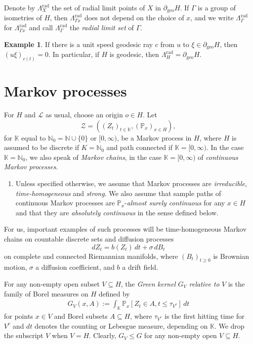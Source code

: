 \documentclass[12pt,a4paper]{amsart}
\numberwithin{equation}{section}
\theoremstyle{definition}
\newtheorem{exa}[equation]{Example}
\DeclareMathOperator{\geo}{geo}
\DeclareMathOperator{\rad}{rad}
\def\K{\mathbb K}
\def\N{\mathbb N}
\def\p{\mathbb P}
\begin{document}
Denote by $\Lambda_X^{\rad}$ the set of radial limit points of $X$ in $\partial_{\geo}H$.
If $\Gamma$ is a group of isometries of $H$, then $\Lambda_{\Gamma x}^{\rad}$ does not depend on the choice of $x$, and we write $\Lambda_\Gamma^{\rad}$ for $\Lambda_{\Gamma x}^{\rad}$ and call $\Lambda_\Gamma^{\rad}$ the \emph{radial limit set} of $\Gamma$.

\begin{exa}\label{exaradial}
If there is a unit speed geodesic ray $c$ from $u$ to $\xi\in\partial_{\geo}H$, then $(u\xi)_{c(t)}=0$.
In particular, if $H$ is geodesic, then $\Lambda_H^{\rad}=\partial_{\geo}H$.
\end{exa}

\section{Markov processes}\label{secmark}

For $H$ and $\mathcal{L}$ as usual, choose an origin $o\in H$.
Let \[\mathcal{Z}=((Z_t)_{t\in \K},(\mathbb{P}_x)_{x\in H}),\] for $\K$ equal to $\N_0=\N\cup\{0\}$ or $[0,\infty)$, be a Markov process in $H$, where $H$ is assumed to be discrete if $K=\N_0$ and path connected if $\K=[0,\infty)$.
In the case $\K=\N_0$, we also speak of \emph{Markov chains}, in the case $\K=[0,\infty)$ of \emph{continuous Markov processes}.

\begin{enumerate}[label=(MP)]
    \item\label{conmar} Unless specified otherwise, we assume that Markov processes are \emph{irreducible}, \emph{time-homogeneous} and \emph{strong}.
    We also assume that sample paths of continuous Markov processes are $\p_x$-\emph{almost surely continuous} for any $x\in H$ and that they are \emph{absolutely continuous} in the sense defined below.
\end{enumerate}
For us, important examples of such processes will be time-homogeneous Markov chains on countable discrete sets and  diffusion processes \[dZ_t=b(Z_t)\,dt+\sigma\,dB_t\] on complete and connected Riemannian manifolds, where $(B_t)_{t\geq 0}$ is Brownian motion, $\sigma$ a diffusion coefficient, and $b$ a drift field.

For any non-empty open subset $V\subseteq H$, the \emph{Green kernel $G_V$ relative to $V$} is the family of Borel measures on $H$ defined by
\begin{align*}
    G_V(x,A):=\int_{\K} \p_x[Z_t\in A, t\leq  \tau_{V^c}]\,dt
\end{align*}
for points $x\in V$ and Borel subsets $A\subseteq H$,
where $\tau_{V^c}$ is the first hitting time for $V^c$ and $dt$ denotes the counting or Lebesgue measure, depending on $\K$.
We drop the subscript $V$ when $V=H$.
Clearly, $G_V\le G$ for any non-empty open $V\subseteq H$.
\end{document}
